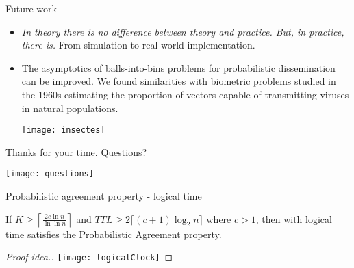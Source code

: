 
\begin{frame}{Future work}
    
  \begin{itemize}

  \item \emph{In theory there is no difference between theory and practice. But, in practice, there is.} From simulation to real-world implementation.
  
  \item The asymptotics of balls-into-bins problems for probabilistic dissemination can be improved. We found similarities with biometric problems studied in the 1960s estimating the proportion of vectors capable of transmitting viruses in natural populations.

\vspace{-6mm}

  \begin{center}
    \texttt{[image: insectes]}
  \end{center}

\end{itemize}

\end{frame}


\begin{frame}[plain]{Thanks for your time. Questions?}
  
  \begin{center}
    \texttt{[image: questions]}
  \end{center}
  
\end{frame}


\subtitle[Extra]{Extra}


\begin{frame}{Probabilistic agreement property - logical time \EPTO}
  
\begin{lemma}
If $K \geq \left\lceil\frac{2e\ln n}{\ln\ln n}\right\rceil$ and $TTL \geq 2 \lceil (c+1) \log_2 n \rceil$ where $c>1$, then \EPTO{} with logical time satisfies the Probabilistic Agreement property.
\end{lemma}

\begin{proof}[Proof idea.]

\centering
\texttt{[image: logicalClock]}

\end{proof}

\end{frame}

